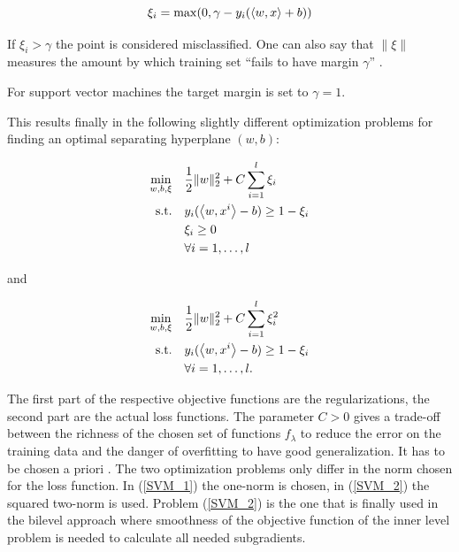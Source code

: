 \[\xi_i = \max(0, \gamma - y_i(\left\langle w,x\right\rangle+b))\] 

If \(\xi_i > \gamma\) the point is considered misclassified. 
One can also say that \(\|\xi\|\) measures the amount by which training set ``fails to have margin \(\gamma\)'' \cite{Cristianini2000}.

For support vector machines the target margin is set to \(\gamma = 1\).

This results finally in the following slightly different
optimization problems for finding an optimal separating hyperplane \((w,b)\): 

\begin{align}
\begin{split}
	\min_{w,b,\xi} \quad & \frac{1}{2} \|w\|^2_2+C\sum_{i=1}^l{\xi_i} \\
	\text{s.t.} \quad & y_i(\left\langle w,x^i\right\rangle-b) \geq 1 - \xi_i \\
	& \xi_i \geq 0 \\
	& 	\forall i = 1, \dots , l
\end{split}
\label{SVM_1}
\end{align}

and

\begin{align}
\begin{split}
	\min_{w,b,\xi} \quad & \frac{1}{2} \|w\|^2_2+C\sum_{i=1}^l{\xi_i^2} \vspace{0.5ex}\\
	\text{s.t.} \quad & y_i(\Langle w,x^i\Rangle-b) \geq 1 - \xi_i \vspace{0.5ex}\\
	& 	\forall i = 1, \dots , l.
\end{split}
\label{SVM_2}
\end{align}

The first part of the respective objective functions are the regularizations, the second part are the actual loss functions. 
The parameter \(C > 0\) gives a trade-off between the richness of the chosen set of functions \(f_{\lambda}\) to reduce the error on the training data and the danger of overfitting to have good generalization. It has to be chosen a priori \cite{Kunapuli2008}.
The two optimization problems only differ in the norm chosen for the loss function. In (\ref{SVM_1}) the one-norm is chosen, in (\ref{SVM_2}) the squared two-norm is used.
Problem (\ref{SVM_2}) is the one that is finally used in the bilevel approach where smoothness of the objective function of the inner level problem is needed to calculate all needed subgradients.

